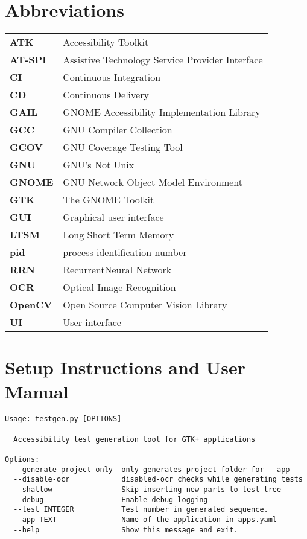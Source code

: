 
\chapter{Abbreviations}
\renewcommand{\arraystretch}{1.2}
\begin{tabular}{lp{12cm}}%
\textbf{ATK} & Accessibility Toolkit \\
\textbf{AT-SPI} & Assistive Technology Service Provider Interface \\
\textbf{CI} & Continuous Integration \\
\textbf{CD} & Continuous Delivery \\
\textbf{GAIL} & GNOME Accessibility Implementation Library \\
\textbf{GCC} & GNU Compiler Collection \\
\textbf{GCOV} & GNU Coverage Testing Tool \\
\textbf{GNU} & GNU's Not Unix \\
\textbf{GNOME} & GNU Network Object Model Environment \\
\textbf{GTK} & The GNOME Toolkit \\
\textbf{GUI} & Graphical user interface \\
\textbf{LTSM} & Long Short Term Memory \\
\textbf{pid} & process identification number \\
\textbf{RRN} & RecurrentNeural Network \\
\textbf{OCR} & Optical Image Recognition \\
\textbf{OpenCV} & Open Source Computer Vision Library \\
\textbf{UI} & User interface \\
\end{tabular}


\chapter{Setup Instructions and User Manual}\label{manual}

\begin{lstlisting}[]
Usage: testgen.py [OPTIONS]

  Accessibility test generation tool for GTK+ applications

Options:
  --generate-project-only  only generates project folder for --app
  --disable-ocr            disabled-ocr checks while generating tests
  --shallow                Skip inserting new parts to test tree
  --debug                  Enable debug logging
  --test INTEGER           Test number in generated sequence.
  --app TEXT               Name of the application in apps.yaml
  --help                   Show this message and exit.

\end{lstlisting}



